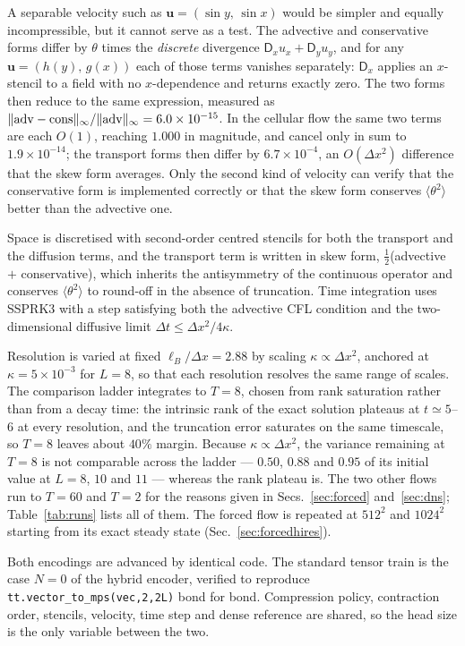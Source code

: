\documentclass[aps,prfluids,reprint,onecolumn,amsmath,amssymb,nofootinbib,floatfix]{revtex4-2}
\newcommand{\code}[1]{\texttt{\small #1}}
\begin{document}
A separable velocity such as $\mathbf{u}=(\sin y,\,\sin x)$ would be simpler and
equally incompressible, but it cannot serve as a test. The advective and
conservative forms differ by $\theta$ times the \emph{discrete} divergence
$\mathsf{D}_xu_x+\mathsf{D}_yu_y$, and for any $\mathbf{u}=(h(y),\,g(x))$ each
of those terms vanishes separately: $\mathsf{D}_x$ applies an $x$-stencil to a
field with no $x$-dependence and returns exactly zero. The two forms then reduce
to the same expression, measured as
$\|{\rm adv}-{\rm cons}\|_\infty/\|{\rm adv}\|_\infty=6.0\times10^{-15}$. In the
cellular flow the same two terms are each $O(1)$, reaching $1.000$ in magnitude,
and cancel only in sum to $1.9\times10^{-14}$; the transport forms then differ
by $6.7\times10^{-4}$, an $O(\Delta x^2)$ difference that the skew form
averages. Only the second kind of velocity can verify that the conservative form
is implemented correctly or that the skew form conserves
$\langle\theta^2\rangle$ better than the advective one.

Space is discretised with second-order centred stencils for both the transport
and the diffusion terms, and the transport term is written in skew form,
$\tfrac12$(advective $+$ conservative), which inherits the antisymmetry of the
continuous operator and conserves $\langle\theta^2\rangle$ to round-off in the
absence of truncation. Time integration uses SSPRK3 with a step satisfying both
the advective CFL condition and the two-dimensional diffusive limit
$\Delta t\le\Delta x^2/4\kappa$.

Resolution is varied at fixed $\ell_B/\Delta x=2.88$ by scaling
$\kappa\propto\Delta x^2$, anchored at $\kappa=5\times10^{-3}$ for $L=8$, so that
each resolution resolves the same range of scales. The comparison ladder
integrates to $T=8$, chosen from rank saturation rather than from a decay time:
the intrinsic rank of the exact solution plateaus at $t\simeq5$--$6$ at every
resolution, and the truncation error saturates on the same timescale, so $T=8$
leaves about $40\%$ margin. Because $\kappa\propto\Delta x^2$, the variance
remaining at $T=8$ is not comparable across the ladder --- $0.50$, $0.88$ and
$0.95$ of its initial value at $L=8$, $10$ and $11$ --- whereas the rank plateau
is. The two other flows run to $T=60$ and $T=2$ for the reasons given in
Secs.~\ref{sec:forced} and~\ref{sec:dns}; Table~\ref{tab:runs} lists all of
them. The forced flow is repeated at $512^2$ and $1024^2$ starting from its
exact steady state (Sec.~\ref{sec:forcedhires}).

Both encodings are advanced by identical code. The standard tensor train is the
case $N=0$ of the hybrid encoder, verified to reproduce
\code{tt.vector\_to\_mps(vec,2,2L)} bond for bond. Compression policy,
contraction order, stencils, velocity, time step and dense reference are shared,
so the head size is the only variable between the two.
\end{document}
